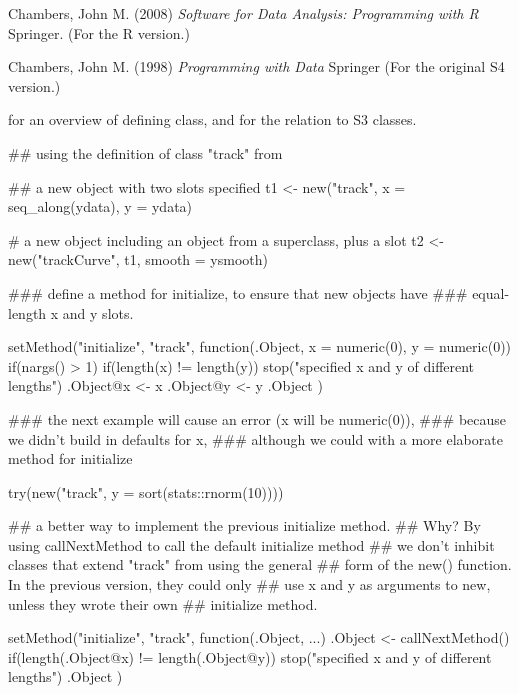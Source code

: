 %
\begin{References}\relax
Chambers, John M. (2008)
\emph{Software for Data Analysis: Programming with R}
Springer.  (For the R version.)

Chambers, John M. (1998)
\emph{Programming with Data}
Springer (For the original S4 version.) 
\end{References}
%
\begin{SeeAlso}\relax
  for an overview of defining class, and
 for the relation to S3 classes. 
\end{SeeAlso}
%
\begin{Examples}
\begin{ExampleCode}
## using the definition of class "track" from 



## a new object with two slots specified
t1 <- new("track", x = seq_along(ydata), y = ydata)

# a new object including an object from a superclass, plus a slot
t2 <- new("trackCurve", t1, smooth = ysmooth)

### define a method for initialize, to ensure that new objects have
### equal-length x and y slots.

setMethod("initialize",
          "track",
          function(.Object, x = numeric(0), y = numeric(0)) {
            if(nargs() > 1) {
              if(length(x) != length(y))
                stop("specified x and y of different lengths")
              .Object@x <- x
              .Object@y <- y
            }
            .Object
          })

### the next example will cause an error (x will be numeric(0)),
### because we didn't build in defaults for x,
### although we could with a more elaborate method for initialize

try(new("track", y = sort(stats::rnorm(10))))

## a better way to implement the previous initialize method.
## Why?  By using callNextMethod to call the default initialize method
## we don't inhibit classes that extend "track" from using the general
## form of the new() function.  In the previous version, they could only
## use x and y as arguments to new, unless they wrote their own
## initialize method.

setMethod("initialize", "track", function(.Object, ...) {
    .Object <- callNextMethod()
    if(length(.Object@x) != length(.Object@y))
     stop("specified x and y of different lengths")
    .Object
  })

\end{ExampleCode}
\end{Examples}
